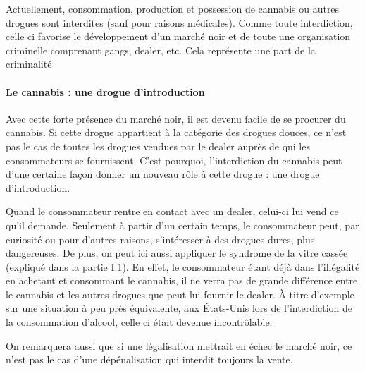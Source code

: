     Actuellement, consommation, production et possession de cannabis ou autres drogues sont interdites (sauf pour raisons médicales). Comme toute interdiction, celle ci favorise le développement d’un marché noir et de toute une organisation criminelle comprenant gangs, dealer, etc. Cela représente une part de la criminalité

\paragraph{Le cannabis : une drogue d’introduction}

    Avec cette forte présence du marché noir, il est devenu facile de se procurer du cannabis. Si cette drogue appartient à la catégorie des drogues douces, ce n’est pas le cas de toutes les drogues vendues par le dealer auprès de qui les consommateurs se fournissent. C’est pourquoi, l’interdiction du cannabis peut d’une certaine façon donner un nouveau rôle à cette drogue : une drogue d’introduction.

    Quand le consommateur rentre en contact avec un dealer, celui-ci lui vend ce qu’il demande. Seulement à partir d’un certain temps, le consommateur peut, par curiosité ou pour d’autres raisons, s’intéresser à des drogues dures, plus dangereuses. De plus, on peut ici aussi appliquer le syndrome de la vitre cassée (expliqué dans la partie I.1). En effet, le consommateur étant déjà dans l’illégalité en achetant et consommant le cannabis, il ne verra pas de grande différence entre le cannabis et les autres drogues que peut lui fournir le dealer. À titre d’exemple sur une situation à peu près équivalente, aux États-Unis lors de l’interdiction de la consommation d’alcool, celle ci était devenue incontrôlable. 

On remarquera aussi que si une légalisation mettrait en échec le marché noir, ce n’est pas le cas d’une dépénalisation qui interdit toujours la vente.
